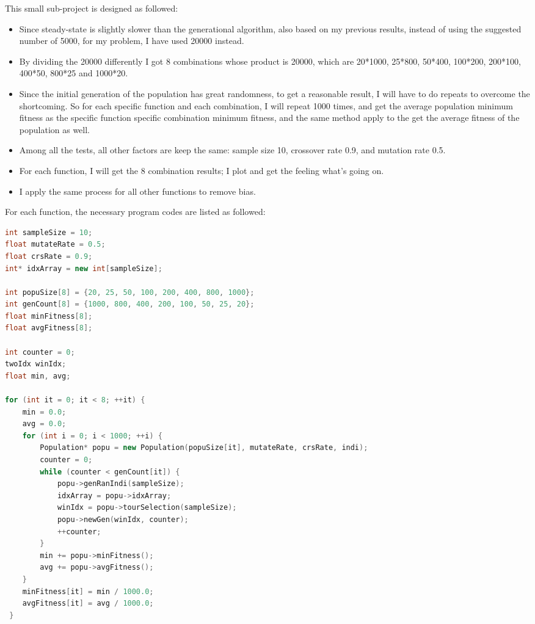 \documentclass[b5paper,11pt, abstraction, titlepage]{scrartcl}
\begin{document}
\begin{CJK}{UTF8}{gbsn}
This small sub-project is designed as followed:
\begin{itemize}
  \itemsep=-3pt
\item Since steady-state is slightly slower than the generational algorithm, also based on my previous results, instead of using the suggested number of 5000, for my problem, I have used 20000 instead.
\item By dividing the 20000 differently I got 8 combinations whose product is 20000, which are 20*1000, 25*800, 50*400, 100*200, 200*100, 400*50, 800*25 and 1000*20.
\item Since the initial generation of the population has great randomness, to get a reasonable result, I will have to do repeats to overcome the shortcoming. So for each specific function and each combination, I will repeat 1000 times, and get the average population minimum fitness as the specific function specific combination minimum fitness, and the same method apply to the get the average fitness of the population as well.
\item Among all the tests, all other factors are keep the same: sample size 10, crossover rate 0.9, and mutation rate 0.5.
\item For each function, I will get the 8 combination results; I plot and get the feeling what's going on.
\item I apply the same process for all other functions to remove bias. 
\end{itemize}
For each function, the necessary program codes are listed as followed:
\begin{lstlisting}[language=c++]
int sampleSize = 10;
float mutateRate = 0.5;
float crsRate = 0.9;
int* idxArray = new int[sampleSize];

int popuSize[8] = {20, 25, 50, 100, 200, 400, 800, 1000};
int genCount[8] = {1000, 800, 400, 200, 100, 50, 25, 20};
float minFitness[8];
float avgFitness[8];

int counter = 0;
twoIdx winIdx;
float min, avg;
     
for (int it = 0; it < 8; ++it) {     
    min = 0.0;
    avg = 0.0;
    for (int i = 0; i < 1000; ++i) {         
        Population* popu = new Population(popuSize[it], mutateRate, crsRate, indi);
        counter = 0;
        while (counter < genCount[it]) {
            popu->genRanIndi(sampleSize);
            idxArray = popu->idxArray;
            winIdx = popu->tourSelection(sampleSize);
            popu->newGen(winIdx, counter);
            ++counter;
        }
        min += popu->minFitness();
        avg += popu->avgFitness();
    }
    minFitness[it] = min / 1000.0;
    avgFitness[it] = avg / 1000.0;
 }


\end{lstlisting}
\end{CJK}
\end{document}
